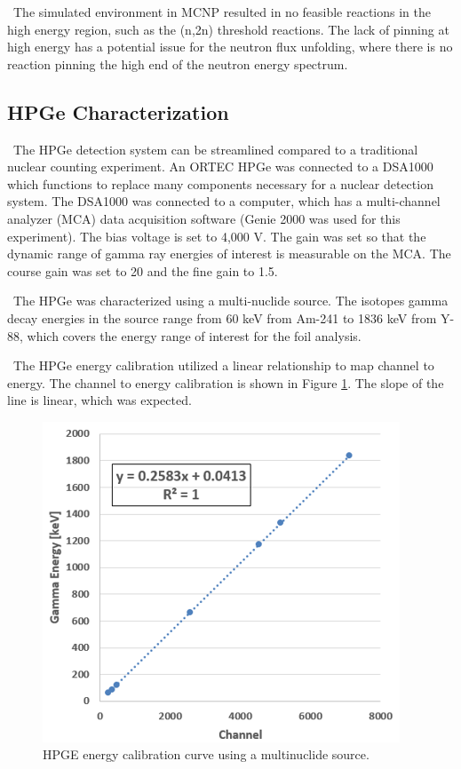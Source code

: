 \documentclass[journal]{IEEEtran}
\let\MYoriglatexcaption\caption
\renewcommand{\caption}[2][\relax]{\MYoriglatexcaption[#2]{#2}}
\begin{document}
	\ The simulated environment in MCNP resulted in no feasible reactions in the high energy region, such as the (n,2n) threshold reactions. The lack of pinning at high energy has a potential issue for the neutron flux unfolding, where there is no reaction pinning the high end of the neutron energy spectrum. 
	
	\subsection{HPGe Characterization}
	
	\ The HPGe detection system can be streamlined compared to a traditional nuclear counting experiment. An ORTEC HPGe was connected to a DSA1000 which functions to replace many components necessary for a nuclear detection system. The DSA1000 was connected to a computer, which has a multi-channel analyzer (MCA) data acquisition software (Genie 2000 was used for this experiment). The bias voltage is set to 4,000 V. The gain was set so that the dynamic range of gamma ray energies of interest is measurable on the MCA. The course gain was set to 20 and the fine gain to 1.5. 
	
	\ The HPGe was characterized using a multi-nuclide source. The isotopes gamma decay energies in the source range from 60 keV from Am-241 to 1836 keV from Y-88, which covers the energy range of interest for the foil analysis. 
	
	\ The HPGe energy calibration utilized a linear relationship to map channel to energy. The channel to energy calibration is shown in Figure \ref{fig:ecal}. The slope of the line is linear, which was expected. 
	
	\begin{figure}[h]
		\includegraphics[width=\linewidth]{Figures/ECal.png}
		\caption{HPGE energy calibration curve using a multinuclide source.}
		\label{fig:ecal}
	\end{figure}
	
\end{document}
